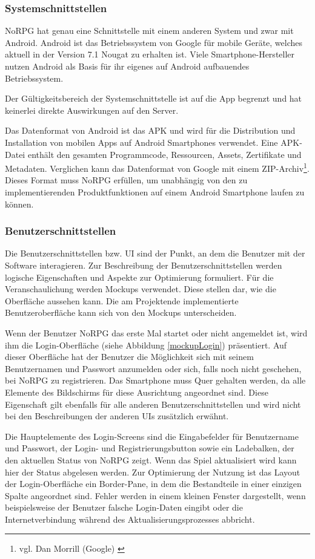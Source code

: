 		\subsubsection{Systemschnittstellen}
			NoRPG hat genau eine Schnittstelle mit einem anderen System und zwar mit Android. Android ist das Betriebssystem von Google für mobile Geräte, welches aktuell in der Version 7.1 Nougat zu erhalten ist. Viele Smartphone-Hersteller nutzen Android als Basis für ihr eigenes auf Android aufbauendes Betriebssystem. 
			
			Der Gültigkeitsbereich der Systemschnittstelle ist auf die App begrenzt und hat keinerlei direkte Auswirkungen auf den Server. 
			
			Das Datenformat von Android ist das \ac{APK} und wird für die Distribution und Installation von mobilen Apps auf Android Smartphones verwendet. Eine \ac{APK}-Datei enthält den gesamten Programmcode, Ressourcen, Assets, Zertifikate und Metadaten. Verglichen kann das Datenformat von Google mit einem ZIP-Archiv\footnote{vgl. Dan Morrill (Google) \cite{google1}}. Dieses Format muss NoRPG erfüllen, um unabhängig von den zu implementierenden Produktfunktionen auf einem Android Smartphone laufen zu können.
			
		\subsubsection{Benutzerschnittstellen}
			Die Benutzerschnittstellen bzw. \ac{UI} sind der Punkt, an dem die Benutzer mit der Software interagieren. Zur Beschreibung der Benutzerschnittstellen werden logische Eigenschaften und Aspekte zur Optimierung formuliert. Für die Veranschaulichung werden Mockups verwendet. Diese stellen dar, wie die Oberfläche aussehen kann. Die am Projektende implementierte Benutzeroberfläche kann sich von den Mockups unterscheiden.
			
			Wenn der Benutzer NoRPG das erste Mal startet oder nicht angemeldet ist, wird ihm die Login-Oberfläche (siehe Abbildung \ref{mockupLogin}) präsentiert. Auf dieser Oberfläche hat der Benutzer die Möglichkeit sich mit seinem Benutzernamen und Passwort anzumelden oder sich, falls noch nicht geschehen, bei NoRPG zu registrieren. Das Smartphone muss Quer gehalten werden, da alle Elemente des Bildschirms für diese Ausrichtung angeordnet sind. Diese Eigenschaft gilt ebenfalls für alle anderen Benutzerschnittstellen und wird nicht bei den Beschreibungen der anderen \acp{UI} zusätzlich erwähnt.  
			
			Die Hauptelemente des Login-Screens sind die Eingabefelder für Benutzername und Passwort, der Login- und Registrierungsbutton sowie ein Ladebalken, der den aktuellen Status von NoRPG zeigt. Wenn das Spiel aktualisiert wird kann hier der Status abgelesen werden. Zur Optimierung der Nutzung ist das Layout der Login-Oberfläche ein Border-Pane, in dem die Bestandteile in einer einzigen Spalte angeordnet sind. Fehler werden in einem kleinen Fenster dargestellt, wenn beispielsweise der Benutzer falsche Login-Daten eingibt oder die Internetverbindung während des Aktualisierungsprozesses abbricht.

